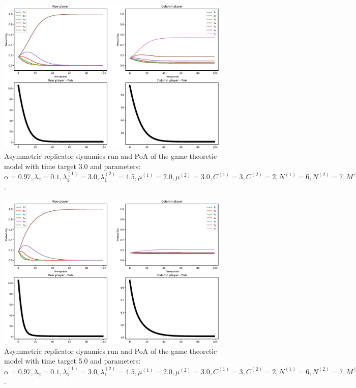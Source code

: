 \begin{figure}[H]
    \includegraphics[width=\textwidth, trim = 0 60 0 60, clip]{chapters/00_appendix/02_more_game_results/Bin/poa_ard_target_3.eps}
    \caption{Asymmetric replicator dynamics run and PoA of the game theoretic
    model with time target 3.0 and parameters: \(\alpha = 0.97,
    \lambda_2 = 0.1, \lambda_1^{(1)} = 3.0, \lambda_1^{(2)} = 4.5,
    \mu^{(1)} = 2.0, \mu^{(2)} = 3.0, C^{(1)} = 3, C^{(2)} = 2,
    N^{(1)} = 6, N^{(2)} = 7, M^{(1)} = 5, M^{(2)} = 4\).}
    \label{fig:poa_ard_target_3}
\end{figure}

\begin{figure}[H]
    \includegraphics[width=\textwidth, trim = 0 60 0 60, clip]{chapters/00_appendix/02_more_game_results/Bin/poa_ard_target_5.eps}
    \caption{Asymmetric replicator dynamics run and PoA of the game theoretic
    model with time target 5.0 and parameters: \(\alpha = 0.97,
    \lambda_2 = 0.1, \lambda_1^{(1)} = 3.0, \lambda_1^{(2)} = 4.5,
    \mu^{(1)} = 2.0, \mu^{(2)} = 3.0, C^{(1)} = 3, C^{(2)} = 2,
    N^{(1)} = 6, N^{(2)} = 7, M^{(1)} = 5, M^{(2)} = 4\).}
    \label{fig:poa_ard_target_5}
\end{figure}


